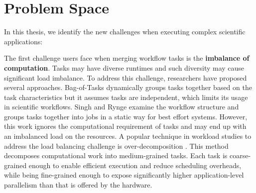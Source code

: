 
\section{Problem Space}

In this thesis, we identify the new challenges when executing complex scientific applications:

The first challenge users face when merging workflow tasks is the \textbf{imbalance of computation}. Tasks may have diverse runtimes and such diversity may cause significant load imbalance. To address this challenge, researchers have proposed several approaches. Bag-of-Tasks \cite{Hussin2010, Celaya2010, Oprescu2010} dynamically groups tasks together based on the task characteristics but it assumes tasks are independent, which limits its usage in scientific workflows. Singh \cite{Singh2008} and Rynge \cite{Rynge2012} examine the workflow structure and groups tasks together into jobs in a static way for best effort systems. However, this work ignores the computational requirement of tasks and may end up with an imbalanced load on the resources. A popular technique in workload studies to address the load balancing challenge is over-decomposition \cite{Lifflander2012}. This method decomposes computational work into medium-grained tasks. Each task is coarse-grained enough to enable efficient execution and reduce scheduling overheads, while being fine-grained enough to expose significantly higher application-level parallelism than that is offered by the hardware. 

